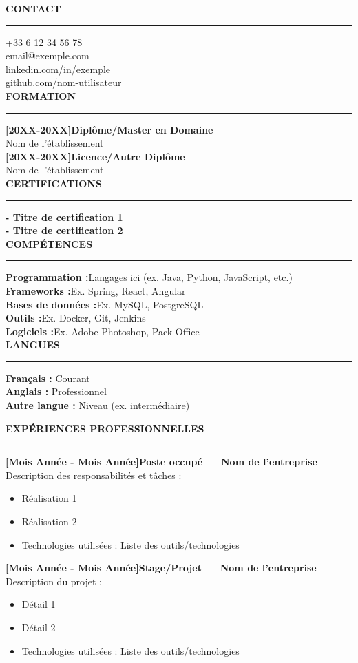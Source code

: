 \documentclass[a4paper,11pt]{article}
\newenvironment{smallerfont}{\small}{}
\newcommand{\cvitem}[2]{\textbf{#1}#2\\}
\newlength{\leftcolwidth}
\newlength{\rightcolwidth}
\newcommand{\sectiontitle}[1]{%
  \vspace{0.5em}
  \textcolor{primarycolor}{\Large\textbf{#1}}%
  \par\vspace{-0.3em}%
  \textcolor{primarycolor}{\rule{\linewidth}{0.4pt}}%
  \vspace{0.3em}%
}
\begin{document}
\noindent\begin{minipage}[t]{\leftcolwidth}
\sectiontitle{ CONTACT}
\cvitem{}{ +33 6 12 34 56 78}
\cvitem{}{ email@exemple.com}
\cvitem{}{ linkedin.com/in/exemple}
\cvitem{}{ github.com/nom-utilisateur}

\sectiontitle{ FORMATION}
\cvitem{[20XX-20XX]}{\textbf{Diplôme/Master en Domaine}}
\cvitem{}{Nom de l'établissement}
\cvitem{[20XX-20XX]}{\textbf{Licence/Autre Diplôme}}
\cvitem{}{Nom de l'établissement}

\sectiontitle{ CERTIFICATIONS}
\cvitem{}{\textbf{- Titre de certification 1}}
\cvitem{}{\textbf{- Titre de certification 2}}

\sectiontitle{ COMPÉTENCES}
\cvitem{Programmation :}{Langages ici (ex. Java, Python, JavaScript, etc.)}
\cvitem{Frameworks :}{Ex. Spring, React, Angular}
\cvitem{Bases de données :}{Ex. MySQL, PostgreSQL}
\cvitem{Outils :}{Ex. Docker, Git, Jenkins}
\cvitem{Logiciels :}{Ex. Adobe Photoshop, Pack Office}

\sectiontitle{ LANGUES}
\cvitem{Français :}{ Courant}
\cvitem{Anglais :}{ Professionnel}
\cvitem{Autre langue :}{ Niveau (ex. intermédiaire)}

\end{minipage}%
\hfill%
%
\hfill%
\begin{minipage}[t]{\rightcolwidth}
\sectiontitle{ EXPÉRIENCES PROFESSIONNELLES}
\begin{smallerfont}
\cvitem{[Mois Année - Mois Année]}{\textbf{Poste occupé — Nom de l'entreprise}}
Description des responsabilités et tâches :
\begin{itemize}[leftmargin=*,nosep]
\item Réalisation 1
\item Réalisation 2
\item Technologies utilisées : Liste des outils/technologies \\
\end{itemize}

\cvitem{[Mois Année - Mois Année]}{\textbf{Stage/Projet — Nom de l'entreprise}}
Description du projet :
\begin{itemize}[leftmargin=*,nosep]
\item Détail 1
\item Détail 2
\item Technologies utilisées : Liste des outils/technologies
\end{itemize}
\end{smallerfont}

\end{minipage}
\end{document}
